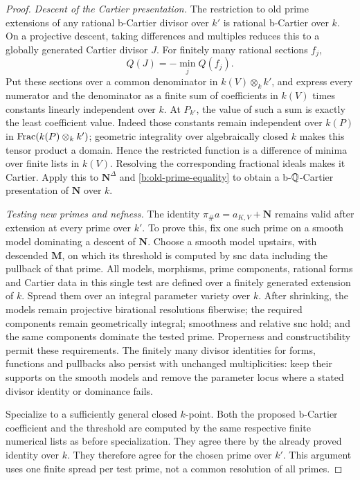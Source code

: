\begin{proof}
\medskip\noindent
\emph{Descent of the Cartier presentation.}
The restriction to old prime extensions of any rational b-Cartier
divisor over \(k'\) is rational b-Cartier over \(k\).
On a projective descent, taking differences and multiples reduces
this to a globally generated Cartier divisor \(J\). For finitely many
rational sections \(f_j\),
\[
                          Q(J)=-\min_j Q(f_j).
\]
Put these sections over a common denominator in
\(k(V)\otimes_k k'\), and express every numerator and the denominator
as a finite sum of coefficients in \(k(V)\) times constants linearly
independent over \(k\). At \(P_{k'}\), the value of such a sum is
exactly the least coefficient value. Indeed those constants remain
independent over \(k(P)\) in
\(\operatorname{Frac}(k(P)\otimes_k k')\); geometric integrality over algebraically
closed \(k\) makes this tensor product a domain.
Hence the restricted function is a difference of minima over finite
lists in \(k(V)\). Resolving the corresponding fractional ideals
makes it Cartier. Apply this to \(\mathbf N^\Delta\) and
\eqref{b:old-prime-equality} to obtain a b-\(\mathbb Q\)-Cartier presentation
of \(\mathbf N\) over \(k\).

\medskip\noindent
\emph{Testing new primes and nefness.}
The identity \(\pi_\#a=a_{K,V}+\mathbf N\) remains valid after
extension at every prime over \(k'\). To prove this, fix one such
prime on a smooth model dominating a descent of \(\mathbf N\).
Choose a smooth model upstairs, with descended \(\mathbf M\),
on which its threshold is computed by snc data including the
pullback of that prime. All models, morphisms, prime components,
rational forms and Cartier data in this single test are defined over
a finitely generated extension of \(k\). Spread them over an
integral parameter variety over \(k\). After shrinking, the models
remain projective birational resolutions fiberwise; the required
components remain geometrically integral; smoothness and relative
snc hold; and the same components dominate the tested prime.
Properness and constructibility permit these requirements.
The finitely many divisor identities for forms, functions and
pullbacks also persist with unchanged multiplicities: keep their
supports on the smooth models and remove the parameter locus where
a stated divisor identity or dominance fails.

Specialize to a sufficiently general closed \(k\)-point. Both the
proposed b-Cartier coefficient and the threshold are computed by
the same respective finite numerical lists as before specialization.
They agree there by the already proved identity over \(k\).
They therefore agree for the chosen prime over \(k'\).
This argument uses one finite spread per test prime, not a common
resolution of all primes.


\end{proof}
